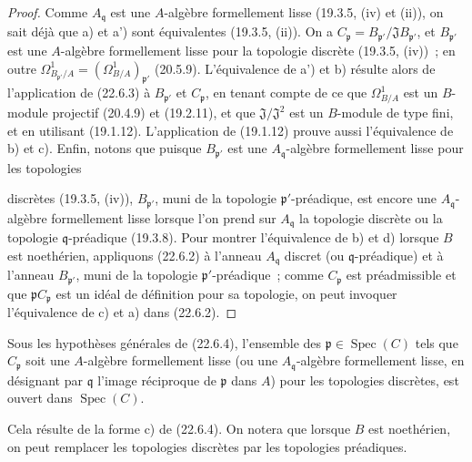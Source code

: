 \begin{proof}
Comme $A_{\mathfrak q}$ est une $A$-algèbre formellement lisse (19.3.5, (iv)
et (ii)), on sait déjà que a) et a') sont équivalentes (19.3.5, (ii)). On a
$C_{\mathfrak p}=B_{\mathfrak p'}/\mathfrak J B_{\mathfrak p'}$, et
$B_{\mathfrak p'}$ est une $A$-algèbre formellement lisse pour la topologie
discrète (19.3.5, (iv))~; en outre
$\Omega^1_{B_{\mathfrak p'}/A}=(\Omega^1_{B/A})_{\mathfrak p'}$ (20.5.9).
L'équivalence de a') et b) résulte alors de l'application de (22.6.3) à
$B_{\mathfrak p'}$ et $C_{\mathfrak p}$, en tenant compte de ce que
$\Omega^1_{B/A}$ est un $B$-module projectif (20.4.9) et (19.2.11), et que
$\mathfrak J/\mathfrak J^2$ est un $B$-module de type fini, et en utilisant
(19.1.12). L'application de (19.1.12) prouve aussi l'équivalence de b) et c).
Enfin, notons que puisque $B_{\mathfrak p'}$ est une
$A_{\mathfrak q}$-algèbre formellement lisse pour les topologies


discrètes (19.3.5, (iv)), $B_{\mathfrak p'}$, muni de la topologie
$\mathfrak p'$-préadique, est encore une $A_{\mathfrak q}$-algèbre
formellement lisse lorsque l'on prend sur $A_{\mathfrak q}$ la topologie
discrète ou la topologie $\mathfrak q$-préadique (19.3.8). Pour montrer
l'équivalence de b) et d) lorsque $B$ est noethérien, appliquons (22.6.2) à
l'anneau $A_{\mathfrak q}$ discret (ou $\mathfrak q$-préadique) et à l'anneau
$B_{\mathfrak p'}$, muni de la topologie $\mathfrak p'$-préadique~; comme
$C_{\mathfrak p}$ est préadmissible et que $\mathfrak pC_{\mathfrak p}$ est
un idéal de définition pour sa topologie, on peut invoquer l'équivalence de
c) et a) dans (22.6.2).
\end{proof}

\begin{corollary}[22.6.5]
\label{0.22.6.5-fr}
Sous les hypothèses générales de (22.6.4), l'ensemble des
$\mathfrak p\in\operatorname{Spec}(C)$ tels que $C_{\mathfrak p}$ soit une $A$-algèbre
formellement lisse (ou une $A_{\mathfrak q}$-algèbre formellement lisse, en
désignant par $\mathfrak q$ l'image réciproque de $\mathfrak p$ dans $A$)
pour les topologies discrètes, est ouvert dans $\operatorname{Spec}(C)$.
\end{corollary}

Cela résulte de la forme c) de (22.6.4). On notera que lorsque $B$ est
noethérien, on peut remplacer les topologies discrètes par les topologies
préadiques.

